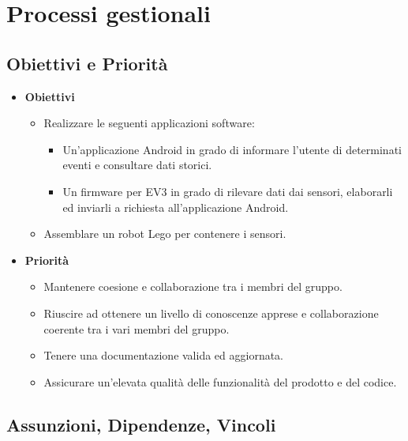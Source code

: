 \documentclass{article}
\begin{document}
\section{Processi gestionali}

\subsection{Obiettivi e Priorità}

\begin{itemize}
\item
\textbf{Obiettivi}

\begin{itemize}
\item
Realizzare le seguenti applicazioni software:

\begin{itemize}
\item
Un'applicazione Android in grado di informare l'utente di determinati eventi e consultare dati storici.
\item
Un firmware per EV3 in grado di rilevare dati dai sensori, elaborarli ed inviarli a richiesta all'applicazione Android.
\end{itemize}
\item
Assemblare un robot Lego per contenere i sensori.
\end{itemize}
\item
\textbf{Priorità}

\begin{itemize}
\item
Mantenere coesione e collaborazione tra i membri del gruppo.
\item
Riuscire ad ottenere un livello di conoscenze apprese e collaborazione coerente tra i vari membri del gruppo.
\item
Tenere una documentazione valida ed aggiornata.
\item
Assicurare un'elevata qualità delle funzionalità del prodotto e del
codice.
\end{itemize}
\end{itemize}

\subsection{Assunzioni, Dipendenze, Vincoli}
\end{document}
